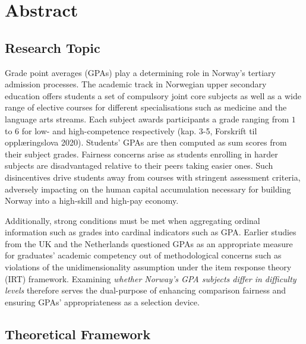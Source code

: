 \section{Abstract}


\subsection{Research Topic}

Grade point averages (GPAs) play a determining role in Norway's tertiary admission processes. The academic track in Norwegian upper secondary education offers students a set of compulsory joint core subjects as well as a wide range of elective courses for different specialisations such as medicine and the language arts streams. Each subject awards participants a grade ranging from $1$ to $6$ for low- and high-competence respectively (kap. 3-5, Forskrift til oppl{\ae}ringslova 2020). Students' GPAs are then computed as sum scores from their subject grades. Fairness concerns arise as students enrolling in harder subjects are disadvantaged relative to their peers taking easier ones. Such disincentives drive students away from courses with stringent assessment criteria, adversely impacting on the human capital accumulation necessary for building Norway into a high-skill and high-pay economy.

Additionally, strong conditions must be met when aggregating ordinal information such as grades into cardinal indicators such as GPA. Earlier studies from the UK \parencite{he:2018} and the Netherlands \parencite{korobko:2008} questioned GPAs as an appropriate measure for graduates' academic competency out of methodological concerns such as violations of the unidimensionality assumption under the item response theory (IRT) framework. Examining \emph{whether Norway's GPA subjects differ in difficulty levels} therefore serves the dual-purpose of enhancing comparison fairness and ensuring GPAs' appropriateness as a selection device.

\subsection{Theoretical Framework}

